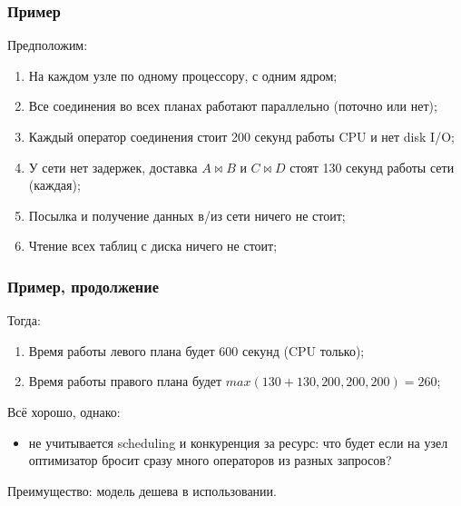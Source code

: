 \documentclass{beamer}
\begin{document}
\begin{frame}
\frametitle{Пример}

Предположим:
\begin{enumerate}
  \setlength\itemsep{1em}
  \item На каждом узле по одному процессору, с одним ядром;
  \item Все соединения во всех планах работают параллельно (поточно или нет);
  \item Каждый оператор соединения стоит 200 секунд работы CPU и нет disk I/O;
  \item У сети нет задержек, доставка $A \bowtie B$ и $C \bowtie D$ стоят 130 секунд работы сети (каждая);
  \item Посылка и получение данных в/из сети ничего не стоит;
  \item Чтение всех таблиц с диска ничего не стоит;
\end{enumerate}

\end{frame}

\begin{frame}
\frametitle{Пример, продолжение}

Тогда:
\begin{enumerate}
  \setlength\itemsep{1em}
  \item Время работы левого плана будет $600$ секунд (CPU только);
  \item Время работы правого плана будет $max (130 + 130, 200, 200, 200) = 260$;
\end{enumerate}

Всё хорошо, однако: 
\begin{itemize}
  \setlength\itemsep{1em}
  \item не учитывается scheduling и конкуренция за ресурс: что будет если на узел оптимизатор бросит сразу много операторов из разных запросов?
\end{itemize}

Преимущество: модель дешева в использовании.

\end{frame}
\end{document}

